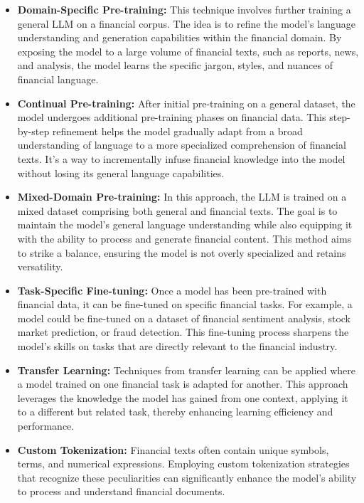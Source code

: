 \begin{itemize}
	\item \textbf{Domain-Specific Pre-training:}{
		      This technique involves further training a general LLM on a financial corpus. The idea is to refine the model's language understanding and generation capabilities within the financial domain. By exposing the model to a large volume of financial texts, such as reports, news, and analysis, the model learns the specific jargon, styles, and nuances of financial language.
	      }

	\item \textbf{Continual Pre-training:}{
		      After initial pre-training on a general dataset, the model undergoes additional pre-training phases on financial data. This step-by-step refinement helps the model gradually adapt from a broad understanding of language to a more specialized comprehension of financial texts. It's a way to incrementally infuse financial knowledge into the model without losing its general language capabilities.
	      }

	\item \textbf{Mixed-Domain Pre-training:}{
		      In this approach, the LLM is trained on a mixed dataset comprising both general and financial texts. The goal is to maintain the model's general language understanding while also equipping it with the ability to process and generate financial content. This method aims to strike a balance, ensuring the model is not overly specialized and retains versatility.
	      }

	\item \textbf{Task-Specific Fine-tuning:}{
		      Once a model has been pre-trained with financial data, it can be fine-tuned on specific financial tasks. For example, a model could be fine-tuned on a dataset of financial sentiment analysis, stock market prediction, or fraud detection. This fine-tuning process sharpens the model's skills on tasks that are directly relevant to the financial industry.
	      }

	\item \textbf{Transfer Learning:}{
		      Techniques from transfer learning can be applied where a model trained on one financial task is adapted for another. This approach leverages the knowledge the model has gained from one context, applying it to a different but related task, thereby enhancing learning efficiency and performance.
	      }

	\item \textbf{Custom Tokenization:}{
		      Financial texts often contain unique symbols, terms, and numerical expressions. Employing custom tokenization strategies that recognize these peculiarities can significantly enhance the model's ability to process and understand financial documents.
	      }
\end{itemize}

